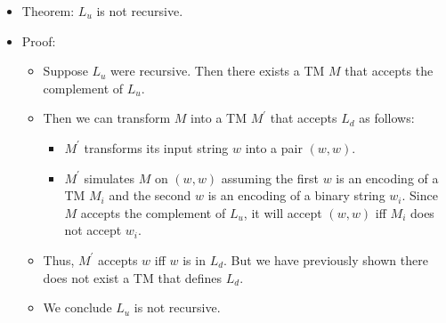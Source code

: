 \documentclass[]{article}
\begin{document}
\begin{itemize}
\item Theorem: $L_u$ is not recursive.
\item Proof:
\begin{itemize}
\item Suppose $L_u$ were recursive. Then there exists a TM $M$ that accepts the
complement of $L_u$.
\item Then we can transform $M$ into a TM $M^\prime$ that accepts $L_d$ as
follows:
\begin{itemize}
\item $M^\prime$ transforms its input string $w$ into a pair $(w,w)$.
\item $M^\prime$ simulates $M$ on $(w,w)$ assuming the first $w$ is an encoding
of a TM $M_i$ and the second $w$ is an encoding of a binary string $w_i$. Since
$M$ accepts the complement of $L_u$, it will accept $(w,w)$ iff $M_i$ does not
accept $w_i$.
\end{itemize}
\item Thus, $M^\prime$ accepts $w$ iff $w$ is in $L_d$. But we have previously
shown there does not exist a TM that defines $L_d$.
\item We conclude $L_u$ is not recursive.
\end{itemize}
\end{itemize}
\end{document}
